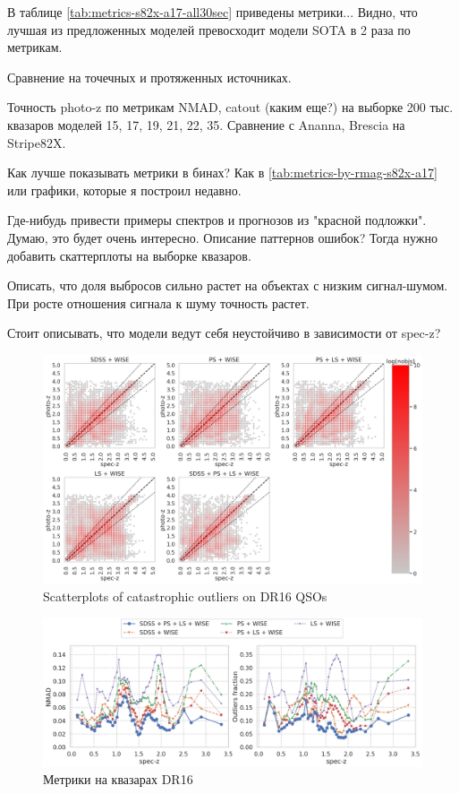 В таблице \ref{tab:metrics-s82x-a17-all30sec} приведены метрики... Видно, что лучшая из предложенных моделей превосходит модели SOTA в 2 раза по метрикам.

Сравнение на точечных и протяженных источниках.

Точность photo-z по метрикам NMAD, catout (каким еще?) на выборке 200 тыс. квазаров моделей 15, 17, 19, 21, 22, 35. Сравнение с Ananna, Brescia на Stripe82X.


Как лучше показывать метрики в бинах? Как в \ref{tab:metrics-by-rmag-s82x-a17} или графики, которые я построил недавно. 

Где-нибудь привести примеры спектров и прогнозов из "красной подложки". Думаю, это будет очень интересно. Описание паттернов ошибок? Тогда нужно добавить скаттерплоты на выборке квазаров.

Описать, что доля выбросов сильно растет на объектах с низким сигнал-шумом. При росте отношения сигнала к шуму точность растет.

Стоит описывать, что модели ведут себя неустойчиво в зависимости от spec-z?

\begin{figure}
    \centering
    \includegraphics[width=\linewidth]{images/scatterplots-dr16qso.png}
    \caption{Scatterplots of catastrophic outliers on DR16 QSOs}
    \label{fig:my_label}
\end{figure}

\begin{figure}
    \centering
    \includegraphics[width=\linewidth]{images/metrics-dr16qso-zspec.png}
    \caption{Метрики на квазарах DR16}
    \label{fig:my_label}
\end{figure}

